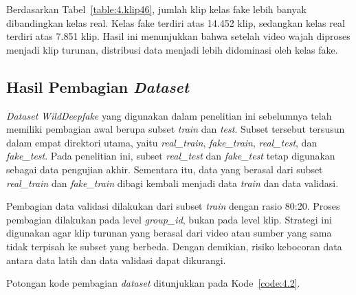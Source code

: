 Berdasarkan Tabel~\ref{table:4.klip46}, jumlah klip kelas fake lebih banyak dibandingkan kelas real. Kelas fake terdiri atas 14.452 klip, sedangkan kelas real terdiri atas 7.851 klip. Hasil ini menunjukkan bahwa setelah video wajah diproses menjadi klip turunan, distribusi data menjadi lebih didominasi oleh kelas fake.

\subsection{Hasil Pembagian \textit{Dataset}} \label{IV.Split}
\textit{Dataset} \textit{WildDeepfake} yang digunakan dalam penelitian ini sebelumnya telah memiliki pembagian awal berupa subset \textit{train} dan \textit{test}. Subset tersebut tersusun dalam empat direktori utama, yaitu \textit{real\_train}, \textit{fake\_train}, \textit{real\_test}, dan \textit{fake\_test}. Pada penelitian ini, subset \textit{real\_test} dan \textit{fake\_test} tetap digunakan sebagai data pengujian akhir. Sementara itu, data yang berasal dari subset \textit{real\_train} dan \textit{fake\_train} dibagi kembali menjadi data \textit{train} dan data validasi.

Pembagian data validasi dilakukan dari subset \textit{train} dengan rasio 80:20. Proses pembagian dilakukan pada level \textit{group\_id}, bukan pada level klip. Strategi ini digunakan agar klip turunan yang berasal dari video atau sumber yang sama tidak terpisah ke subset yang berbeda. Dengan demikian, risiko kebocoran data antara data latih dan data validasi dapat dikurangi.

Potongan kode pembagian \textit{dataset} ditunjukkan pada Kode~\ref{code:4.2}.

